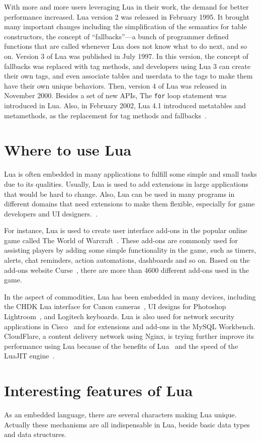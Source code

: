 With more and more users leveraging Lua in their work, the demand for better performance increased. Lua version 2 was released in February 1995. It brought many important changes including the simplification of the semantics for table constructors,
the concept of ``fallbacks''---a bunch of programmer defined functions that are called whenever Lua does not know what to do next, and so on. Version 3 of Lua was published in July 1997. In this version, the concept of fallbacks was replaced with tag methods, and developers using Lua 3 can create their own tags, and even associate tables and userdata to the tags to make them have their own unique behaviors. Then, version 4 of Lua was released in November 2000. Besides a set of new APIs, The {\tt for} loop statement was introduced in Lua. 
Also, in February 2002, Lua 4.1 introduced metatables and metamethods, as the replacement for tag methods and fallbacks~\cite{TEL}.

\section{Where to use Lua}
Lua is often embedded in many applications to fulfill some simple and small tasks due to its qualities. Usually, Lua is used to add extensions in large applications that would be hard to change. Also, Lua can be used in many programs in different domains that need extensions to make them flexible, especially for game developers and UI designers.~\cite{AIL}. 

For instance, Lua is used to create user interface add-ons in the popular online game called The World of Warcraft~\cite{WLA}. These add-ons are commonly used for assisting players by adding some simple functionality in the game, such as timers, alerts, chat reminders, action automations, dashboards and so on. Based on the add-ons website Curse~\cite{WCU}, there are more than 4600 different add-ons used in the game.

In the aspect of commodities, Lua has been embedded in many devices, including the CHDK Lua interface for Canon cameras~\cite{CLFL}, UI designs for Photoshop Lightroom~\cite{APLL}, and Logitech keyboards. Lua is also used for network security applications in Cisco~\cite{CISCO} and for extensions and add-ons in the MySQL Workbench. CloudFlare, a content delivery network using Nginx, is trying further improve its performance using Lua because of the benefits of Lua~\cite{NPL} and the speed of the LuaJIT engine~\cite{LJT}.

\section{Interesting features of Lua}
As an embedded language, there are several characters making Lua unique. 
Actually these mechanisms are all indispensable in Lua, beside basic data types and data structures.

